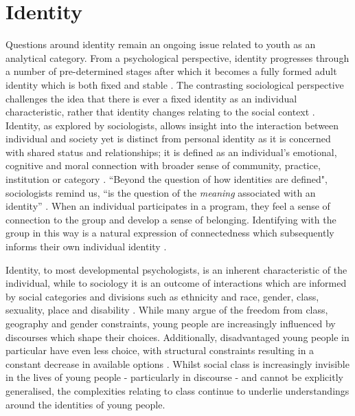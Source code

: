 \section{Identity}
\label{IdentityPsychSoc}
Questions around identity remain an ongoing issue related to youth as an analytical category. From a psychological perspective, identity progresses through a number of pre-determined stages after which it becomes a fully formed adult identity which is both fixed and stable \citep{Stokes2015}. The contrasting sociological perspective challenges the idea that there is ever a fixed identity as an individual characteristic, rather that identity changes relating to the social context \citep{Stokes2015}. Identity, as explored by sociologists, allows insight into the interaction between individual and society yet is distinct from personal identity as it is concerned with shared status and relationships; it is defined as an individual's emotional, cognitive and moral connection with broader sense of community, practice, institution or category \citep[][p285]{Polletta2001}. “Beyond the question of how identities are defined", sociologists remind us, “is the question of the \textit{meaning} associated with an identity” \citep[][p83, emphasis added]{Deaux1991}. When an individual participates in a program, they feel a sense of connection to the group and develop a sense of belonging. Identifying with the group in this way is a natural expression of connectedness which subsequently informs their own individual identity \citep{Futch2016}. 

Identity, to most developmental psychologists, is an inherent characteristic of the individual, while to sociology it is an outcome of interactions which are informed by social categories and divisions such as ethnicity and race, gender, class, sexuality, place and disability \citep{Stokes2015}. While many argue of the freedom from class, geography and gender constraints, young people are increasingly influenced by discourses which shape their choices. Additionally, disadvantaged young people in particular have even less choice, with structural constraints resulting in a constant decrease in available options \citep{Stokes2015}. Whilst social class is increasingly invisible in the lives of young people - particularly in discourse - and cannot be explicitly generalised, the complexities relating to class continue to underlie understandings around the identities of young people. 

